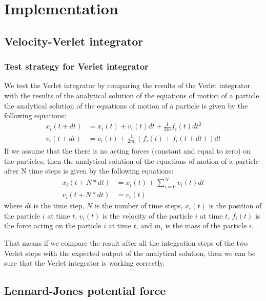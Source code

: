 \chapter{Implementation}\label{chap:Implementation}

\section{Velocity-Verlet integrator}
    \subsection{Test strategy for Verlet integrator}
    We test the Verlet integrator by comparing the results of the Verlet integrator with the results of the analytical solution of the equations of motion of a particle. the analytical solution of the equations of motion of a particle is given by the following equations:
    \begin{equation}
    \label{eq:analytical}
        \begin{aligned}
        x_i(t+dt) &= x_i(t) + v_i(t)dt + \frac{1}{2m}f_i(t)dt^2 \\
        v_i(t+dt) &= v_i(t) + \frac{1}{2m_i}(f_i(t)+f_i(t+dt))dt
        \end{aligned}
    \end{equation}
    If we assume that the there is no acting forces (constant and equal to zero) on the particles, then the analytical solution of the equations of motion of a particle after N time steps is given by the following equations:
    \begin{equation}
    \label{eq:analytical2}
        \begin{aligned}
        x_i(t+N*dt) &= x_i(t) + \sum_{i=0}^{N}v_i(t)dt \\
        v_i(t+N*dt) &= v_i(t)
        \end{aligned}
    \end{equation}
    where $dt$ is the time step, $N$ is the number of time steps, $x_i(t)$ is the position of the particle $i$ at time $t$, $v_i(t)$ is the velocity of the particle $i$ at time $t$, $f_i(t)$ is the force acting on the particle $i$ at time $t$, and $m_i$ is the mass of the particle $i$.

    That means if we compare the result after all the integration steps of the two Verlet steps with the expected output of the analytical solution, then we can be sure that the Verlet integrator is working correctly.

\section{Lennard-Jones potential force}
